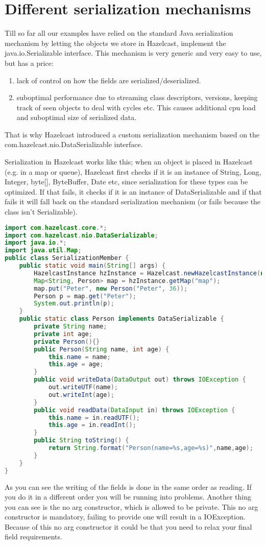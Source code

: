 \chapter{Different serialization mechanisms}
Till so far all our examples have relied on the standard Java serialization mechanism by letting the objects we store in Hazelcast, implement the java.io.Serializable interface. This mechanism is very generic and very easy to use, but has a price:
\begin{enumerate}
\item lack of control on how the fields are serialized/deserialized.
\item suboptimal performance due to streaming class descriptors, versions, keeping track of seen objects to deal with cycles etc. This causes additional cpu load and suboptimal size of serialized data.
\end{enumerate}
That is why Hazelcast introduced a custom serialization mechanism based on the com.hazelcast.nio.DataSerializable interface. 

Serialization in Hazelcast works like this; when an object is placed in Hazelcast (e.g. in a map or queue), Hazelcast first checks if it is an instance of String, Long, Integer, byte[], ByteBuffer, Date etc, since serialization for these types can be optimized. If that fails, it checks if it is an instance of DataSerializable and if that fails it will fall back on the standard serialization mechanism (or fails because the class isn't Serializable).

\begin{lstlisting}[language=java]
import com.hazelcast.core.*;
import com.hazelcast.nio.DataSerializable;
import java.io.*;
import java.util.Map;
public class SerializationMember {
    public static void main(String[] args) {
        HazelcastInstance hzInstance = Hazelcast.newHazelcastInstance(null);
        Map<String, Person> map = hzInstance.getMap("map");
        map.put("Peter", new Person("Peter", 36));
        Person p = map.get("Peter");
        System.out.println(p);
    }
    public static class Person implements DataSerializable {
        private String name;
        private int age;
        private Person(){}
        public Person(String name, int age) {
            this.name = name;
            this.age = age;
        }
        public void writeData(DataOutput out) throws IOException {
            out.writeUTF(name);
            out.writeInt(age);
        }
        public void readData(DataInput in) throws IOException {
            this.name = in.readUTF();
            this.age = in.readInt();
        }
        public String toString() {
            return String.format("Person(name=%s,age=%s)",name,age);
        }
    }
}
\end{lstlisting}
As you can see the writing of the fields is done in the same order as reading. If you do it in a different order you will be running into problems. Another thing you can see is the no arg constructor, which is allowed to be private. This no arg constructor is mandatory, failing to provide one will result in a IOException. Because of this no arg constructor it could be that you need to relax your final field requirements.

